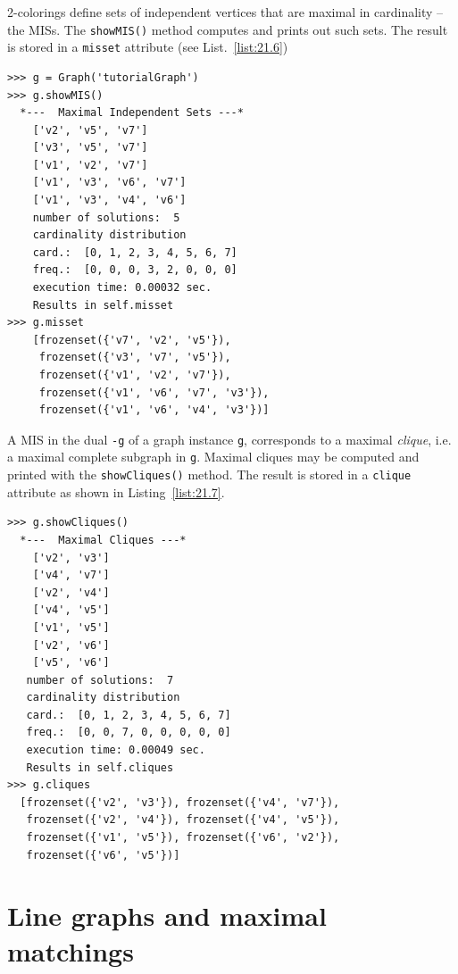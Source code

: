 2-colorings define sets of independent vertices that are maximal in cardinality --the MISs. The \texttt{showMIS()} method  computes and prints out such sets. The result is stored in a \texttt{misset} attribute (see List.~\vref{list:21.6})
\begin{lstlisting}[caption={Computing and printing the maximal independent sets of graph \texttt{g}},label=list:21.6]
>>> g = Graph('tutorialGraph')
>>> g.showMIS()
  *---  Maximal Independent Sets ---*
    ['v2', 'v5', 'v7']
    ['v3', 'v5', 'v7']
    ['v1', 'v2', 'v7']
    ['v1', 'v3', 'v6', 'v7']
    ['v1', 'v3', 'v4', 'v6']
    number of solutions:  5
    cardinality distribution
    card.:  [0, 1, 2, 3, 4, 5, 6, 7]
    freq.:  [0, 0, 0, 3, 2, 0, 0, 0]
    execution time: 0.00032 sec.
    Results in self.misset
>>> g.misset
    [frozenset({'v7', 'v2', 'v5'}), 
     frozenset({'v3', 'v7', 'v5'}), 
     frozenset({'v1', 'v2', 'v7'}), 
     frozenset({'v1', 'v6', 'v7', 'v3'}), 
     frozenset({'v1', 'v6', 'v4', 'v3'})]
\end{lstlisting}

A MIS in the dual \texttt{-g} of a graph instance \texttt{g}, corresponds to a maximal \emph{clique}, i.e. a maximal complete subgraph in \texttt{g}. Maximal cliques may be computed and printed with the \texttt{showCliques()} method. The result is stored in a \texttt{clique} attribute as shown in Listing~\vref{list:21.7}.
\begin{lstlisting}[caption={Computing and printing the maximal independent sets of graph \texttt{g}},label=list:21.7]
>>> g.showCliques()
  *---  Maximal Cliques ---*
    ['v2', 'v3']
    ['v4', 'v7']
    ['v2', 'v4']
    ['v4', 'v5']
    ['v1', 'v5']
    ['v2', 'v6']
    ['v5', 'v6']
   number of solutions:  7
   cardinality distribution
   card.:  [0, 1, 2, 3, 4, 5, 6, 7]
   freq.:  [0, 0, 7, 0, 0, 0, 0, 0]
   execution time: 0.00049 sec.
   Results in self.cliques
>>> g.cliques
  [frozenset({'v2', 'v3'}), frozenset({'v4', 'v7'}), 
   frozenset({'v2', 'v4'}), frozenset({'v4', 'v5'}), 
   frozenset({'v1', 'v5'}), frozenset({'v6', 'v2'}), 
   frozenset({'v6', 'v5'})]
\end{lstlisting}

\section{Line graphs and maximal matchings}
\label{sec:21.4}

